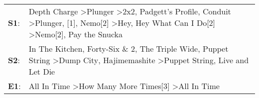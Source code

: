 \begin{supertabular}{p{0.03\textwidth}p{0.92\textwidth}}
 \textbf{S1}:  &  Depth Charge\textsuperscript{} \textgreater \enspace Plunger\textsuperscript{} \textgreater \enspace 2x2\textsuperscript{}, \enspace Padgett's Profile\textsuperscript{}, \enspace Conduit\textsuperscript{} \textgreater \enspace Plunger\textsuperscript{}, [1]\textsuperscript{}, \enspace Nemo[2]\textsuperscript{} \textgreater \enspace Hey, Hey What Can I Do[2]\textsuperscript{} \textgreater \enspace Nemo[2]\textsuperscript{}, \enspace Pay the Snucka\textsuperscript{}  \enspace  \\
 \textbf{S2}:  &                                                                                                                                   In The Kitchen\textsuperscript{}, \enspace Forty-Six \& 2\textsuperscript{}, \enspace The Triple Wide\textsuperscript{}, \enspace Puppet String\textsuperscript{} \textgreater \enspace Dump City\textsuperscript{}, \enspace Hajimemashite\textsuperscript{} \textgreater \enspace Puppet String\textsuperscript{}, \enspace Live and Let Die\textsuperscript{}  \enspace  \\
 \textbf{E1}:  &                                                                                                                                                                                                                                                                                                                                                   All In Time\textsuperscript{} \textgreater \enspace How Many More Times[3]\textsuperscript{} \textgreater \enspace All In Time\textsuperscript{}  \enspace  \\
\end{supertabular}
